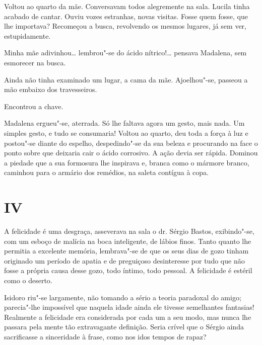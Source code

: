 Voltou ao quarto da mãe. Conversavam todos alegremente na sala. Lucila
tinha acabado de cantar. Ouviu vozes estranhas, novas visitas. Fosse
quem fosse, que lhe importava? Recomeçou a busca, revolvendo os mesmos
lugares, já sem ver, estupidamente.

Minha mãe adivinhou\ldots{} lembrou"-se do ácido nítrico!\ldots{} pensava Madalena,
sem esmorecer na busca.

Ainda não tinha examinado um lugar, a cama da mãe. Ajoelhou"-se, passeou
a mão embaixo dos travesseiros.

Encontrou a chave.

Madalena ergueu"-se, aterrada. Só lhe faltava agora um gesto, mais nada.
Um simples gesto, e tudo se consumaria! Voltou ao quarto, deu toda a
força à luz e postou"-se diante do espelho, despedindo"-se da sua beleza e
procurando na face o ponto sobre que deixaria cair o ácido corrosivo. A
ação devia ser rápida. Dominou a piedade que a sua formosura lhe
inspirava e, branca como o mármore branco, caminhou para o armário dos
remédios, na saleta contígua à copa.

\section{IV}

A felicidade é uma desgraça, asseverava na sala o dr. Sérgio Bastos,
exibindo"-se, com um esboço de malícia na boca inteligente, de lábios
finos. Tanto quanto lhe permitia a excelente memória, lembrava"-se de que
os seus dias de gozo tinham originado um período de apatia e de
preguiçoso desinteresse por tudo que não fosse a própria causa desse
gozo, todo íntimo, todo pessoal. A felicidade é estéril como o deserto.

Isidoro riu"-se largamente, não tomando a sério a teoria paradoxal do
amigo; parecia"-lhe impossível que naquela idade ainda ele tivesse
semelhantes fantasias! Realmente a felicidade era considerada por cada
um a seu modo, mas nunca lhe passara pela mente tão extravagante
definição. Seria crível que o Sérgio ainda sacrificasse a sinceridade à
frase, como nos idos tempos de rapaz?

